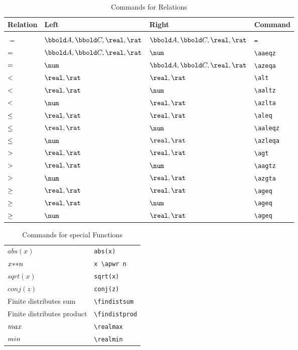 \documentclass[12pt]{article}
\begin{document}
\begin{table}[htbp]
  \centering
  \begin{tabular}{llll}
    Relation & Left & Right & Command \\
    \hline \\
    $=$ & $\arithmos, \complex, \real, \rat$ & $\arithmos, \complex, \real, \rat$ & \verb|=| \\
    $=$ & $\arithmos, \complex, \real, \rat$ & $\num$ & \verb|\aaeqz| \\
    $=$ & $\num$ & $\arithmos, \complex, \real, \rat$ & \verb|\azeqa| \\
    $<$ & $\real, \rat$ & $\real, \rat$ & \verb|\alt| \\
    $<$ & $\real, \rat$ & $\num$ & \verb|\aaltz| \\
    $<$ & $\num$ & $\real, \rat$ & \verb|\azlta| \\
    $\leq$ & $\real, \rat$ & $\real, \rat$ & \verb|\aleq| \\
    $\leq$ & $\real, \rat$ & $\num$ & \verb|\aaleqz| \\
    $\leq$ & $\num$ & $\real, \rat$ & \verb|\azleqa| \\
    $>$ & $\real, \rat$ & $\real, \rat$ & \verb|\agt| \\
    $>$ & $\real, \rat$ & $\num$ & \verb|\aagtz| \\
    $>$ & $\num$ & $\real, \rat$ & \verb|\azgta| \\
    $\geq$ & $\real, \rat$ & $\real, \rat$ & \verb|\ageq| \\
    $\geq$ & $\real, \rat$ & $\num$ & \verb|\ageq| \\
    $\geq$ & $\num$ & $\real, \rat$ & \verb|\ageq| \\
    \hline
  \end{tabular}
  \caption{Commands for Relations}
  \label{tab:latex-relations}
\end{table}
%
\begin{table}[htbp]
  \centering
  \begin{tabular}{ll}
    $abs(x)$    & \verb|abs(x)| \\
    $x {*}{*} n$    & \verb|x \apwr n| \\
    $sqrt(x)$    & \verb|sqrt(x)| \\
    $conj(z)$    & \verb|conj(z)|\\
    Finite distributes sum & \verb|\findistsum| \\
    Finite distributes product & \verb|\findistprod| \\
    $max$ & \verb|\realmax| \\
    $min$ & \verb|\realmin| \\
  \end{tabular}
  \caption{Commands for special Functions}
  \label{tab:latex-special-functions}
\end{table}
\end{document}
